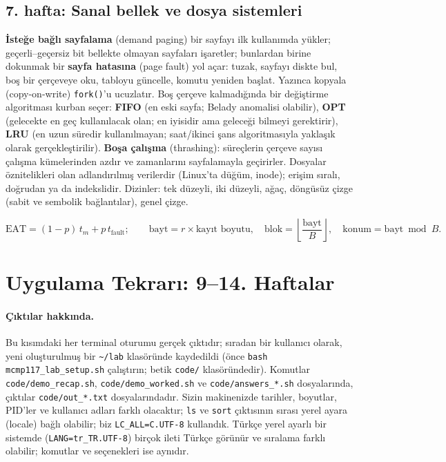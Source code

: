 \documentclass[11pt,a4paper]{article}
\newcommand{\term}[1]{\textbf{\color{mintdeep}#1}}
\newcommand{\cmd}[1]{\texttt{#1}}
\begin{document}
\subsection{7. hafta: Sanal bellek ve dosya sistemleri}
\term{İsteğe bağlı sayfalama} (demand paging) bir sayfayı ilk kullanımda yükler; geçerli--geçersiz bit bellekte olmayan sayfaları işaretler; bunlardan birine dokunmak bir \term{sayfa hatasına} (page fault) yol açar: tuzak, sayfayı diskte bul, boş bir çerçeveye oku, tabloyu güncelle, komutu yeniden başlat. Yazınca kopyala (copy-on-write) \cmd{fork()}'u ucuzlatır. Boş çerçeve kalmadığında bir değiştirme algoritması kurban seçer: \textbf{FIFO} (en eski sayfa; Belady anomalisi olabilir), \textbf{OPT} (gelecekte en geç kullanılacak olan; en iyisidir ama geleceği bilmeyi gerektirir), \textbf{LRU} (en uzun süredir kullanılmayan; saat/ikinci şans algoritmasıyla yaklaşık olarak gerçekleştirilir). \term{Boşa çalışma} (thrashing): süreçlerin çerçeve sayısı çalışma kümelerinden azdır ve zamanlarını sayfalamayla geçirirler. Dosyalar öznitelikleri olan adlandırılmış verilerdir (Linux'ta düğüm, inode); erişim sıralı, doğrudan ya da indekslidir. Dizinler: tek düzeyli, iki düzeyli, ağaç, döngüsüz çizge (sabit ve sembolik bağlantılar), genel çizge.
\begin{example}
\[
\text{EAT} = (1-p)\,t_m + p\,t_{\text{fault}}; \qquad
\text{bayt} = r \times \text{kayıt boyutu},\quad \text{blok} = \left\lfloor \frac{\text{bayt}}{B} \right\rfloor,\quad \text{konum} = \text{bayt} \bmod B.
\]
\end{example}

\section{Uygulama Tekrarı: 9--14. Haftalar}
\label{sec:practical}

{\sloppy \paragraph{Çıktılar hakkında.} Bu kısımdaki her terminal oturumu gerçek çıktıdır; sıradan bir kullanıcı olarak, yeni oluşturulmuş bir \texttt{\textasciitilde/lab} klasöründe kaydedildi (önce \cmd{bash mcmp117\_lab\_setup.sh} çalıştırın; betik \texttt{code/} klasöründedir). Komutlar \texttt{code/demo\_recap.sh}, \texttt{code/demo\_worked.sh} ve \texttt{code/answers\_*.sh} dosyalarında, çıktılar \texttt{code/out\_*.txt} dosyalarındadır. Sizin makinenizde tarihler, boyutlar, PID'ler ve kullanıcı adları farklı olacaktır; \cmd{ls} ve \cmd{sort} çıktısının sırası yerel ayara (locale) bağlı olabilir; biz \cmd{LC\_ALL=C.UTF-8} kullandık. Türkçe yerel ayarlı bir sistemde (\cmd{LANG=tr\_TR.UTF-8}) birçok ileti Türkçe görünür ve sıralama farklı olabilir; komutlar ve seçenekleri ise aynıdır.\par}
\end{document}
